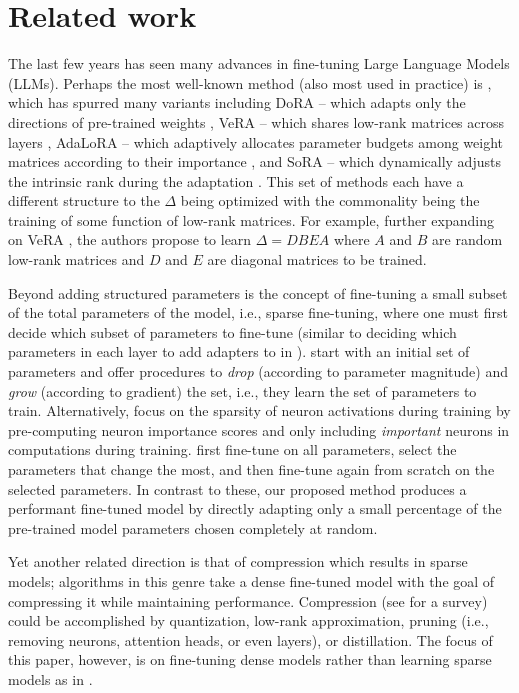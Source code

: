\section{Related work}
\label{s:related_work}
The last few years has seen many advances in fine-tuning Large Language Models (LLMs). Perhaps the most well-known method (also most used in practice) is \lora \cite{hu2021lora}, which has spurred many variants including DoRA -- which adapts only the directions of pre-trained weights \cite{dora2024}, VeRA -- which shares low-rank matrices across layers \cite{vera2024}, AdaLoRA -- which adaptively allocates parameter budgets among weight matrices according to their importance \cite{adalora2023}, and SoRA -- which dynamically adjusts the intrinsic rank during the adaptation \cite{sora2023}. This set of methods each have a different structure to the $\Delta$ being optimized with the commonality being the training of some function of low-rank matrices. For example, further expanding on VeRA \cite{vera2024}, the authors propose to learn $\Delta=DBEA$ where $A$ and $B$ are random low-rank matrices and $D$ and $E$ are diagonal matrices to be trained. 

Beyond adding structured parameters is the concept of fine-tuning a small subset of the total parameters of the model, i.e., sparse fine-tuning, where one must first decide which subset of parameters to fine-tune (similar to deciding which parameters in each layer to add adapters to in \lora). \citet{ansell2024scaling} start with an initial set of parameters and offer procedures to \emph{drop} (according to parameter magnitude) and \emph{grow} (according to gradient) the set, i.e., they learn the set of parameters to train. Alternatively, \citet{ma-etal-2024-sparsity} focus on the sparsity of neuron activations during training by pre-computing neuron importance scores and only including \emph{important} neurons in computations during training. \citet{ansell-etal-2022-composable} first fine-tune on all parameters, select the parameters that change the most, and then fine-tune again from scratch on the selected parameters. 
In contrast to these, our proposed \sparta method produces a performant fine-tuned model by directly adapting only a small percentage of the pre-trained model parameters chosen completely at random.

Yet another related direction is that of compression which results in sparse models; algorithms in this genre take a dense fine-tuned model with the goal of compressing it while maintaining performance. Compression (see \citet{compression_survey} for a survey) could be accomplished by quantization, low-rank approximation, pruning (i.e., removing neurons, attention heads, or even layers), or distillation. The focus of this paper, however, is on fine-tuning dense models rather than learning sparse models as in \citet{sparsity-may-cry}.